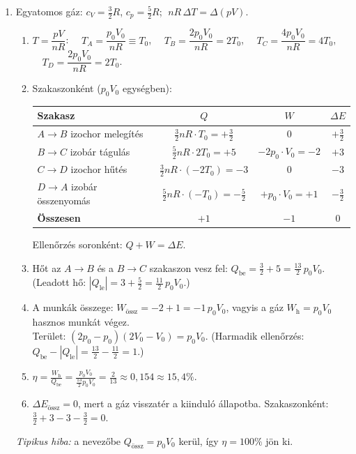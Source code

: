 \documentclass[11pt,a4paper]{article}
\begin{document}
\begin{enumerate}
\item Egyatomos gáz: $c_V = \tfrac32 R$, $c_p = \tfrac52 R$; $\;nR\,\Delta T = \Delta(pV)$.
  \begin{enumerate}
    \item $T = \dfrac{pV}{nR}$: $\quad T_A = \dfrac{p_0V_0}{nR} \equiv T_0$, $\quad
      T_B = \dfrac{2p_0V_0}{nR} = 2T_0$, $\quad T_C = \dfrac{4p_0V_0}{nR} = 4T_0$, $\quad
      T_D = \dfrac{2p_0V_0}{nR} = 2T_0$.
    \item Szakaszonként ($p_0V_0$ egységben):
      \begin{center}
      \renewcommand{\arraystretch}{1.4}
      \begin{tabular}{|l|c|c|c|}
      \hline
      Szakasz & $Q$ & $W$ & $\Delta E$ \\ \hline
      $A\to B$ izochor melegítés & $\tfrac32 nR\cdot T_0 = +\tfrac32$ & $0$ & $+\tfrac32$ \\
      $B\to C$ izobár tágulás    & $\tfrac52 nR\cdot 2T_0 = +5$ & $-2p_0\cdot V_0 = -2$ & $+3$ \\
      $C\to D$ izochor hűtés     & $\tfrac32 nR\cdot(-2T_0) = -3$ & $0$ & $-3$ \\
      $D\to A$ izobár összenyomás & $\tfrac52 nR\cdot(-T_0) = -\tfrac52$ & $+p_0\cdot V_0 = +1$ & $-\tfrac32$ \\ \hline
      \textbf{Összesen} & $+1$ & $-1$ & $0$ \\ \hline
      \end{tabular}
      \end{center}
      Ellenőrzés soronként: $Q + W = \Delta E$.
    \item Hőt az $A\to B$ és a $B\to C$ szakaszon vesz fel:
      $Q_\text{be} = \tfrac32 + 5 = \tfrac{13}{2}\,p_0V_0$.
      (Leadott hő: $|Q_\text{le}| = 3 + \tfrac52 = \tfrac{11}{2}\,p_0V_0$.)
    \item A munkák összege: $W_\text{össz} = -2 + 1 = -1\,p_0V_0$, vagyis a gáz
      $W_\text{h} = p_0V_0$ hasznos munkát végez.\\
      Terület: $(2p_0 - p_0)(2V_0 - V_0) = p_0V_0$. \checkmark{}
      (Harmadik ellenőrzés: $Q_\text{be} - |Q_\text{le}| = \tfrac{13}{2} - \tfrac{11}{2} = 1$.)
    \item $\displaystyle \eta = \frac{W_\text{h}}{Q_\text{be}} = \frac{p_0V_0}{\tfrac{13}{2}p_0V_0}
      = \frac{2}{13} \approx 0{,}154 \approx 15{,}4\%$.
    \item $\Delta E_\text{össz} = 0$, mert a gáz visszatér a kiinduló állapotba.
      Szakaszonként: $\tfrac32 + 3 - 3 - \tfrac32 = 0$. \checkmark
  \end{enumerate}
  \emph{Tipikus hiba:} a nevezőbe $Q_\text{össz} = p_0V_0$ kerül, így $\eta = 100\%$ jön ki.


\end{enumerate}
\end{document}
